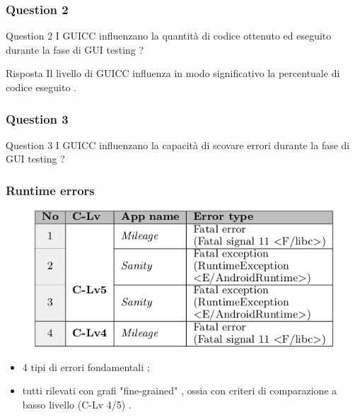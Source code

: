 \documentclass[12pt]{beamer}
\begin{document}

\begin{frame}
\frametitle{Question 2}
\begin{block}{Question 2}
 I GUICC influenzano la quantit\`a di codice ottenuto ed eseguito durante la fase di GUI testing  ? 
\end{block}

\begin{block}{Risposta}
Il livello di GUICC influenza in modo significativo la percentuale di codice eseguito .
\end{block}

\end{frame}



\begin{frame}
\frametitle{Question 3}

\begin{block}{Question 3}
I GUICC influenzano la capacit\`a di scovare errori durante la fase di GUI testing ?
\end{block}


\end{frame}

\begin{frame}
\frametitle{Runtime errors}
\begin{figure}
\includegraphics[width=0.8\linewidth]{images/errors.png}
\end{figure}

\begin{itemize}
\item 4 tipi di errori fondamentali ;
\item tutti rilevati con grafi "fine-grained" , ossia con criteri di comparazione a basso livello (C-Lv 4/5) .

\end{itemize}

\end{frame}
\end{document}
